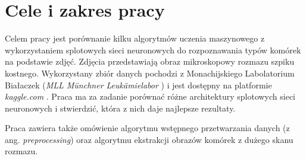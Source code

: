 \section{Cele i zakres pracy}

Celem pracy jest porównanie kilku algorytmów uczenia maszynowego z wykorzystaniem splotowych sieci neuronowych do rozpoznawania typów komórek na podstawie zdjęć.
Zdjęcia przedstawiają obraz mikroskopowy rozmazu szpiku kostnego. Wykorzystany zbiór danych pochodzi z
Monachijskiego Labolatorium Białaczek (\textit{MLL Münchner Leukämielabor} \cite{mll}) i jest dostępny na platformie \textit{kaggle.com} \cite{dataset}.
Praca ma za zadanie porównać różne architektury splotowych sieci neuronowych i stwierdzić, która z nich daje najlepsze rezultaty.

Praca zawiera także omówienie algorytmu wstępnego przetwarzania danych (z ang. \textit{preprocessing}) oraz algorytmu ekstrakcji obrazów komórek z dużego skanu rozmazu.
